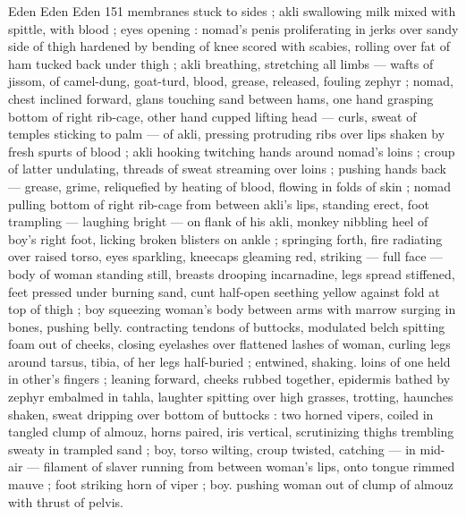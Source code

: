Eden Eden Eden 151
membranes stuck to sides ; akli swallowing milk mixed with spittle,
with blood ; eyes opening : nomad’s penis proliferating in jerks over
sandy side of thigh hardened by bending of knee scored with
scabies, rolling over fat of ham tucked back under thigh ; akli
breathing, stretching all limbs — wafts of jissom, of camel-dung,
goat-turd, blood, grease, released, fouling zephyr ; nomad, chest
inclined forward, glans touching sand between hams, one hand
grasping bottom of right rib-cage, other hand cupped lifting head —
curls, sweat of temples sticking to palm — of akli, pressing
protruding ribs over lips shaken by fresh spurts of blood ; akli
hooking twitching hands around nomad’s loins ; croup of latter
undulating, threads of sweat streaming over loins ; pushing hands
back — grease, grime, reliquefied by heating of blood, flowing in
folds of skin ; nomad pulling bottom of right rib-cage from between
akli's lips, standing erect, foot trampling — laughing bright — on
flank of his akli, monkey nibbling heel of boy's right foot, licking
broken blisters on ankle ; springing forth, fire radiating over raised
torso, eyes sparkling, kneecaps gleaming red, striking — full face
— body of woman standing still, breasts drooping incarnadine, legs
spread stiffened, feet pressed under burning sand, cunt half-open
seething yellow against fold at top of thigh ; boy squeezing woman's
body between arms with marrow surging in bones, pushing belly.
contracting tendons of buttocks, modulated belch spitting foam out
of cheeks, closing eyelashes over flattened lashes of woman, curling
legs around tarsus, tibia, of her legs half-buried ; entwined, shaking.
loins of one held in other's fingers ; leaning forward, cheeks rubbed
together, epidermis bathed by zephyr embalmed in tahla, laughter
spitting over high grasses, trotting, haunches shaken, sweat dripping
over bottom of buttocks : two horned vipers, coiled in tangled clump
of almouz, horns paired, iris vertical, scrutinizing thighs trembling
sweaty in trampled sand ; boy, torso wilting, croup twisted, catching
— in mid-air — filament of slaver running from between woman's
lips, onto tongue rimmed mauve ; foot striking horn of viper ; boy.
pushing woman out of clump of almouz with thrust of pelvis.

